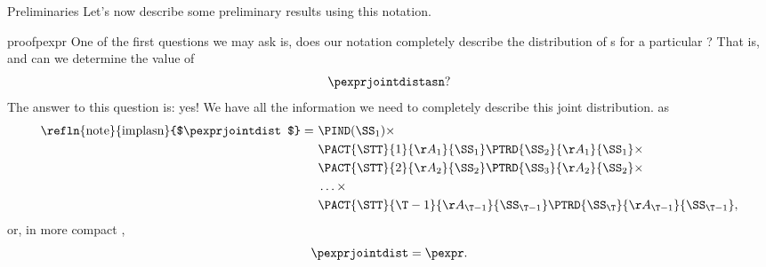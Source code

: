 \begin{part}{Preliminaries}
  Let's now describe some preliminary results using this notation.

  \begin{refenv}{proof}{pexpr}
    One of the first questions we may ask is, does our notation completely describe
    the distribution of \run{}s for a particular \str?
    That is, 
    and
    can we determine the value of
    $$\pexprjointdistasn?$$
    The answer to this question is: yes! 
    We have all the information we need 
    to completely describe 
    this joint distribution. 
     as
    \begin{align*}
      \text{\refln{note}{implasn}{$\pexprjointdist$}}
      =\ &\PIND(\SS_1)\times\\
         &\PACT{\STT}{1}{\AA_1}{\SS_1}
          \PTRD{\SS_2}{\AA_1}{\SS_1}\times\\
         &\PACT{\STT}{2}{\AA_2}{\SS_2}
          \PTRD{\SS_3}{\AA_2}{\SS_2}\times\\
         &\ldots\times\\
         &\PACT{\STT}{{\T - 1}}{\AA_{\T - 1}}{\SS_{\T - 1}}
          \PTRD{\SS_\T}{\AA_{\T - 1}}{\SS_{\T - 1}},
    \end{align*}
    or, in more compact ,
    $$\pexprjointdist = \pexpr.$$
  \end{refenv}
\end{part}
